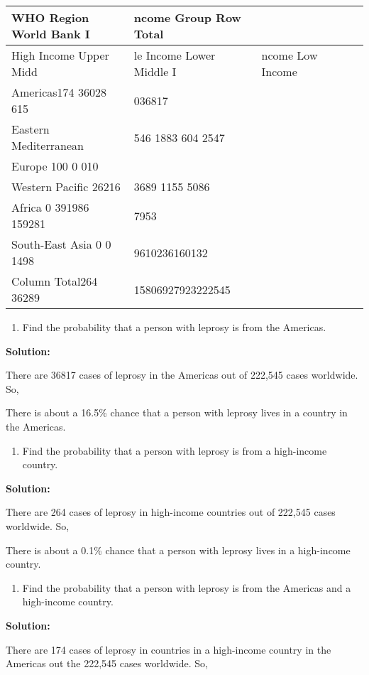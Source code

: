 \documentclass[]{book}
\providecommand{\tightlist}{%
  \setlength{\itemsep}{0pt}\setlength{\parskip}{0pt}}
\begin{document}
\begin{longtable}[]{@{}llllll@{}}
\toprule
WHO Region World Bank I & ncome Group Row Total & & & &\tabularnewline
\midrule
\endhead
High Income Upper Midd & le Income Lower Middle I & ncome Low Income & & &\tabularnewline
Americas174 36028 615 & 036817 & & & &\tabularnewline
Eastern Mediterranean & 546 1883 604 2547 & & & &\tabularnewline
Europe 100 0 010 & & & & &\tabularnewline
Western Pacific 26216 & 3689 1155 5086 & & & &\tabularnewline
Africa 0 391986 159281 & 7953 & & & &\tabularnewline
South-East Asia 0 0 1498 & 9610236160132 & & & &\tabularnewline
Column Total264 36289 & 15806927923222545 & & & &\tabularnewline
\bottomrule
\end{longtable}

\begin{enumerate}
\def\labelenumi{\alph{enumi}.}
\tightlist
\item
  Find the probability that a person with leprosy is from the
  Americas.
\end{enumerate}

\textbf{Solution: }

There are 36817 cases of leprosy in the Americas out of 222,545
cases worldwide. So,

There is about a 16.5\% chance that a person with leprosy lives in a
country in the Americas.

\begin{enumerate}
\def\labelenumi{\alph{enumi}.}
\setcounter{enumi}{1}
\tightlist
\item
  Find the probability that a person with leprosy is from a
  high-income country.
\end{enumerate}

\textbf{Solution:}

There are 264 cases of leprosy in high-income countries out of
222,545 cases worldwide. So,

There is about a 0.1\% chance that a person with leprosy lives in a
high-income country.

\begin{enumerate}
\def\labelenumi{\alph{enumi}.}
\setcounter{enumi}{2}
\tightlist
\item
  Find the probability that a person with leprosy is from the Americas
  and a high-income country.
\end{enumerate}

\textbf{Solution:}

There are 174 cases of leprosy in countries in a high-income country
in the Americas out the 222,545 cases worldwide. So,
\end{document}
